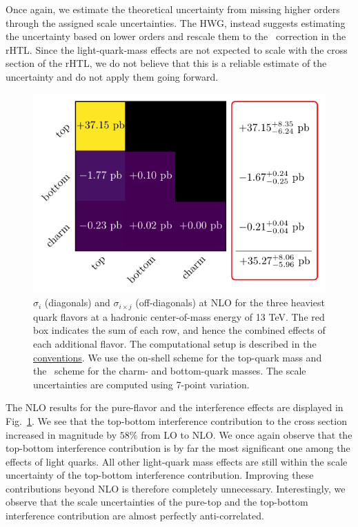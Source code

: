 Once again, we estimate the theoretical uncertainty from missing higher orders through the assigned scale uncertainties. The HWG, instead suggests estimating the uncertainty based on lower orders and rescale them to the \NNNLO\ correction in the \acs{rHTL}. Since the light-quark-mass effects are not expected to scale with the cross section of the \acs{rHTL}, we do not believe that this is a reliable estimate of the uncertainty and do not apply them going forward.

\begin{figure}[ht]
  \centering
  \includegraphics[scale=0.9]{Images/quark_effects_NLO.pdf}
  \caption{$\sigma_{i}$ (diagonals) and $\sigma_{i \times j}$ (off-diagonals) at \acs{NLO} for the three heaviest quark flavors at a hadronic center-of-mass energy of 13 TeV. The red box indicates the sum of each row, and hence the combined effects of each additional flavor. The computational setup is described in the \hyperref[chap:notation_and_conventions]{conventions}. We use the on-shell scheme for the top-quark mass and the \MS\ scheme for the charm- and bottom-quark masses. The scale uncertainties are computed using 7-point variation.}
  \label{fig:4:quark_effects_NLO}
\end{figure}
The \acs{NLO} results for the pure-flavor and the interference effects are displayed in Fig.~\ref{fig:4:quark_effects_NLO}. We see that the top-bottom interference contribution to the cross section increased in magnitude by $58\%$ from \acs{LO} to \acs{NLO}. We once again observe that the top-bottom interference contribution is by far the most significant one among the effects of light quarks. All other light-quark mass effects are still within the scale uncertainty of the top-bottom interference contribution. Improving these contributions beyond \acs{NLO} is therefore completely unnecessary. Interestingly, we observe that the scale uncertainties of the pure-top and the top-bottom interference contribution are almost perfectly anti-correlated.

